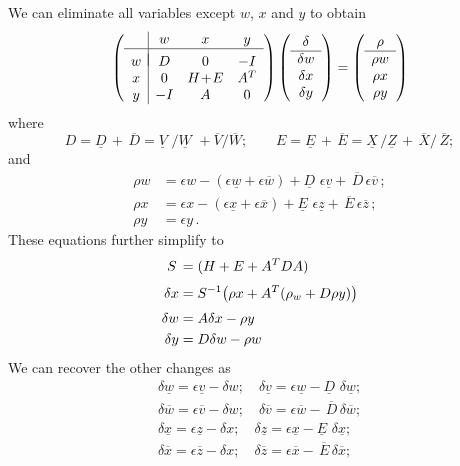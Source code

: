 \documentclass[11pt,a4paper]{article}
\newcommand{\unl}[1]{{\ \!\underline{\;\!\!#1\;\!\!}\ \!}}
\renewcommand{\unl}[1]{{\underline{#1}}}
\newcommand{\ovl}[1]{{\bar{#1}}}
\renewcommand{\ovl}[1]{{\overline{#1}}}
\newcommand{\vl}{{\unl{v}}}
\newcommand{\wl}{{\unl{w}}}
\newcommand{\xl}{{\unl{x}}}
\newcommand{\zl}{{\unl{z}}}
\newcommand{\Dl}{{\underline{D\!}\,}}
\newcommand{\El}{{\underline{E\!}\,}}
\newcommand{\Vl}{{\underline{V\!\!}\,\,}}
\newcommand{\Wl}{{\underline{W\!\!}\,\,}}
\newcommand{\Xl}{{\underline{X\!}\,}}
\newcommand{\Zl}{{\underline{Z\!}\,}}
\newcommand{\vu}{{\ovl{v}}}
\newcommand{\wu}{{\ovl{w}}}
\newcommand{\xu}{{\ovl{x}}}
\newcommand{\zu}{{\ovl{z}}}
\newcommand{\Du}{{\,\overline{\!D}}}
\newcommand{\Eu}{{\,\overline{\!E}}}
\newcommand{\Vu}{{\overline{V}}}
\newcommand{\Wu}{{\overline{W}}}
\newcommand{\Xu}{{\,\overline{\!X}}}
\newcommand{\Zu}{{\,\overline{\!Z}}}
\newcommand{\w}{w}
\newcommand{\x}{x}
\newcommand{\y}{y}
\begin{document}
We can eliminate all variables except $w$, $x$ and $y$ to obtain
\begin{equation*}
\left( \begin{array}{c|ccc}
    & \w&\x&\y \\ \hline \\[-2ex]
  \w & D & 0 & -I \\
  \x & 0 & H\!+\!E & A^T  \\
  \y & -I & A & 0   \\
\end{array}\right)
\left( \begin{array}{c} \delta\\\hline \delta\w\\\delta\x\\\delta\y \end{array}\right)
= \left( \begin{array}{c} \rho\\\hline \rho\w\\\rho\x\\\rho\y \end{array}\right)
\end{equation*}
where
\[ D = \Dl + \Du = \Vl/\Wl+\Vu/\Wu; \qquad E = \El + \Eu = \Xl/\Zl+\Xu/\Zu ; \]
and
\[ \begin{aligned}
      \rho\w &= \epsilon\w - (\epsilon\wl+\epsilon\wu) + \Dl\,\epsilon\vl + \Du\,\epsilon\vu \,; \\
      \rho\x &= \epsilon\x - (\epsilon\xl+\epsilon\xu) + \El\,\epsilon\zl + \Eu\,\epsilon\zu \,; \\
      \rho\y &= \epsilon\y \,.
   \end{aligned} \]
These equations further simplify to
\[ \begin{aligned}
        S\, &= (H+E+A^TDA) \\[\jot]
        \delta\x &= S^{-1} \bigl(\rho\x+A^T(\rho_w+D\rho\y)\bigr) \\[\jot]
        \delta\w &= A \delta\x - \rho\y \\
        \delta\y &= D \delta\w - \rho\w
   \end{aligned} \]
We can recover the other changes as
\[ \begin{gathered}
      \delta\wl = \epsilon\vl - \delta\w; \quad \delta\vl = \epsilon\wl - \Dl\,\delta\wl; \\
      \delta\wu = \epsilon\vu - \delta\w; \quad \delta\vu = \epsilon\wu - \Du\,\delta\wu; \\
      \delta\xl = \epsilon\zl - \delta\x; \quad \delta\zl = \epsilon\xl - \El\,\delta\xl; \\
      \delta\xu = \epsilon\zu - \delta\x; \quad \delta\zu = \epsilon\xu - \Eu\,\delta\xu; \\
    \end{gathered} \]
\end{document}
